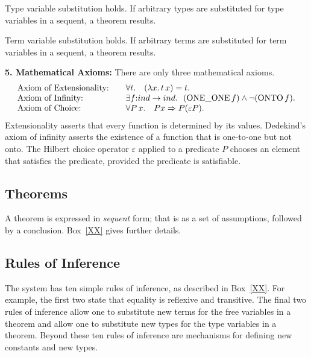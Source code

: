 \documentclass{llncs}
\def\op#1{{\hbox{#1}}} %
\def\tc{\hbox{:}}
\begin{document}
{{Type variable substitution holds.  If arbitrary types are substituted for type variables in a sequent, a theorem results.

Term variable substitution holds.  If arbitrary terms are substituted for term variables in a sequent, a theorem results.



\bigskip
{\bf 5. Mathematical Axioms:} There are only three mathematical axioms.
$$\begin{array}{lll}
\hbox{Axiom of Extensionality:} &\quad\forall t.\hskip1em(\lambda x.\, t\, x) = t.\\
\hbox{Axiom of Infinity:} &\quad\exists f\tc ind\to ind.~~(\op{ONE\_ONE}\,f) \land \neg(\op{ONTO}\, f).\\
\hbox{Axiom of Choice:}&\quad  
\forall P\,x.\hskip1em P x \Rightarrow  P(\varepsilon P).\\
\end{array}
$$
Extensionality asserts that every function is determined by its values. Dedekind's axiom of infinity asserts the existence of a function that is one-to-one but not onto.  The Hilbert choice operator $\varepsilon$ applied to a predicate $P$ chooses an element that satisfies the predicate, provided the
predicate is satisfiable.


}} %
\bigskip



\subsection{Theorems}

A theorem is expressed in {\it sequent} form; that is as a set 
of assumptions, followed by a conclusion.  Box~\ref{XX} gives further details.

\subsection{Rules of Inference}

The system has ten simple rules of inference, as described in Box~\ref{XX}.
For example, the first two state that equality is reflexive and transitive.
The final two rules
of inference allow one to substitute new terms for the free
variables in a theorem and  allow one to substitute new types for the
type variables in a theorem.  Beyond these ten rules of inference are mechanisms for
defining new constants and  new types.
\end{document}
